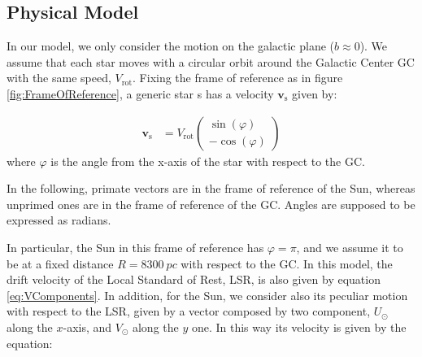\subsection{Physical Model}

In our model, we only consider the motion on the galactic plane ($b\approx0$). We assume that each star moves with a circular orbit around the Galactic Center GC with the same speed, $V_{\text{rot}}$. Fixing the frame of reference as in figure \ref{fig:FrameOfReference}, a generic star s has a velocity $\bm{v}_{\text{s}}$ given by:

\begin{equation}\label{eq:VComponents}
    \begin{aligned}
        \bm{v}_{\text{s}} &= V_{\text{rot}}\begin{pmatrix} \sin(\varphi) \\ -\cos(\varphi) \end{pmatrix}
    \end{aligned}
\end{equation}
\noindent
where $\varphi$ is the angle from the x-axis of the star with respect to the GC. 

In the following, primate vectors are in the frame of reference of the Sun, whereas unprimed ones are in the frame of reference of the GC. Angles are supposed to be expressed as radians.





\noindent
In particular, the Sun in this frame of reference has $\varphi = \pi$, and we assume it to be at a fixed distance $R=\qty{8300}{pc}$ with respect to the GC. In this model, the drift velocity of the Local Standard of Rest, LSR, is also given by equation \ref{eq:VComponents}. In addition, for the Sun, we consider also its peculiar motion with respect to the LSR, given by a vector composed by two component, $U_{\odot}$ along the $x$-axis, and $V_{\odot}$ along the $y$ one. In this way its velocity is given by the equation:

